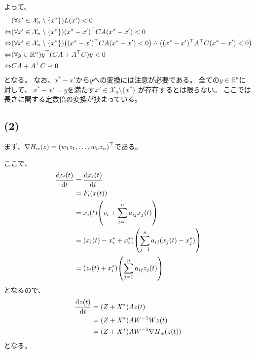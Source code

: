\documentclass[a4paper, 10pt, dvipdfmx]{jlreq}
\begin{document}
よって、
\begin{align*}
                  & (\forall x'\in \mathcal{X}_n\setminus \{x^*\}) \dot{L(x')} < 0                                                                  \\
  \Leftrightarrow & (\forall x'\in \mathcal{X}_n\setminus \{x^*\})(x^*-x')^\top CA(x^*-x')<0                                                        \\
  \Leftrightarrow & (\forall x'\in \mathcal{X}_n\setminus \{x^*\}) \qty((x^*-x')^\top CA(x^*-x')< 0) \wedge \qty((x^*-x')^\top A^\top C(x^*-x')< 0) \\
  \Leftrightarrow & (\forall y \in \mathbb{R}^n) y^\top (CA+A^\top C)y< 0                                                                           \\
  \Leftrightarrow & CA+A^\top C \prec 0
\end{align*}
となる。
なお、$x^*-x'$から$y$への変換には注意が必要である。
全ての$y\in \mathbb{R}^n$に対して、
$x^*-x'=y$を満たす$x'\in \mathcal{X}_n\setminus \{x^*\}$
が存在するとは限らない。
ここでは長さに関する定数倍の変換が挟まっている。

\subsection*{(2)}

まず、$\nabla H_w(z)= \qty(w_1z_1,\dots,w_n z_n)^\top $である。

ここで、
\begin{align*}
  \dv{z_i(t)}{t} & =\dv{x_i(t)}{t}                                               \\
                 & =F_i(x(t))                                                    \\
                 & =x_i(t)\qty(v_i+\sum_{j=1}^{n}a_{ij}x_j(t))                   \\
                 & =(x_i(t)-x^*_i+x^*_i)\qty(\sum_{j=1}^{n}a_{ij}(x_j(t)-x^*_j)) \\
                 & =(z_i(t)+x^*_i)\qty(\sum_{j=1}^{n}a_{ij}z_j(t))
\end{align*}
となるので、
\begin{align*}
  \dv{z(t)}{t} & =(Z+X^*) A z(t)                    \\
               & =(Z+X^*) A W^{-1} W z(t)           \\
               & =(Z+X^*) A W^{-1} \nabla H_w(z(t))
\end{align*}
となる。
\end{document}
